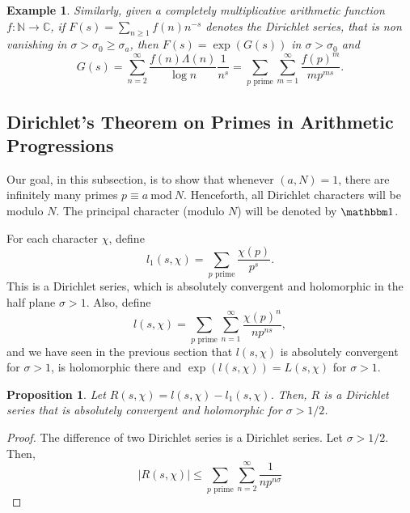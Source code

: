 \documentclass[12pt]{article}
\theoremstyle{thmstyle}
\newtheorem{proposition}[theorem]{Proposition}
\theoremstyle{defstyle}
\newtheorem{example}[theorem]{Example}
\renewcommand{\mod}{~\mathrm{mod}~}
\renewcommand{\le}{\leqslant}
\renewcommand{\ge}{\geqslant}
\begin{document}
\begin{example}
    Similarly, given a completely multiplicative arithmetic function $f:\mathbb N\to\mathbb C$, if $F(s) = \sum_{n\ge 1}f(n)n^{-s}$ denotes the Dirichlet series, that is non vanishing in $\sigma > \sigma_0\ge\sigma_a$, then $F(s) = \exp(G(s))$ in $\sigma > \sigma_0$ and 
    \begin{equation*}
        G(s) = \sum_{n = 2}^\infty\frac{f(n)\Lambda(n)}{\log n}\frac{1}{n^s} = \sum_{p\text{ prime}}\sum_{m = 1}^\infty\frac{f(p)^m}{mp^{ms}}.
    \end{equation*}
\end{example}

\subsection{Dirichlet's Theorem on Primes in Arithmetic Progressions}

Our goal, in this subsection, is to show that whenever $(a, N) = 1$, there are infinitely many primes $p\equiv a\mod N$. Henceforth, all Dirichlet characters will be modulo $N$. The principal character (modulo $N$) will be denoted by $\mathbbm 1$. 

For each character $\chi$, define 
\begin{equation*}
    l_1(s,\chi) = \sum_{p\text{ prime}}\frac{\chi(p)}{p^s}.
\end{equation*}
This is a Dirichlet series, which is absolutely convergent and holomorphic in the half plane $\sigma > 1$. Also, define 
\begin{equation*}
    l(s,\chi) = \sum_{p\text{ prime}}\sum_{n = 1}^\infty\frac{\chi(p)^n}{np^{ns}},
\end{equation*}
and we have seen in the previous section that $l(s,\chi)$ is absolutely convergent for $\sigma > 1$, is holomorphic there and $\exp(l(s,\chi)) = L(s,\chi)$ for $\sigma > 1$.

\begin{proposition}
    Let $R(s,\chi) = l(s,\chi) - l_1(s,\chi)$. Then, $R$ is a Dirichlet series that is absolutely convergent and holomorphic for $\sigma > 1/2$.
\end{proposition}
\begin{proof}
    The difference of two Dirichlet series is a Dirichlet series. Let $\sigma > 1/2$. Then, 
    \begin{equation*}
        |R(s,\chi)|\le\sum_{p\text{ prime}}\sum_{n = 2}^\infty\frac{1}{np^{n\sigma}}
    \end{equation*}
\end{proof}
\end{document}

